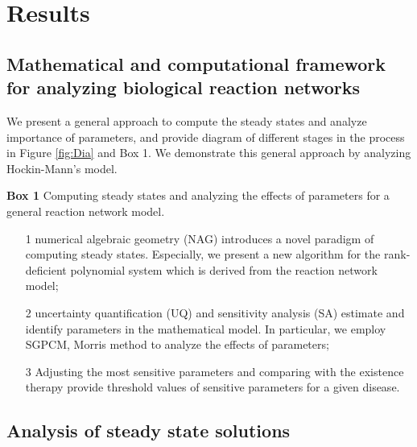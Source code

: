 \def\CTeXPreproc{Created by ctex v0.2.11, don't edit!}\section*{Results}
\label{sec:results}

\subsection*{Mathematical and computational framework for analyzing biological reaction networks}
We present a general approach to compute the steady states and
analyze importance of parameters, and provide diagram of different
stages in the process in Figure \ref{fig:Dia} and Box 1. 
We demonstrate this general approach by analyzing Hockin-Mann's model.


\begin{algorithm}[H]
\SetAlgoLined
{\bf Box 1} Computing
steady states and analyzing the effects of parameters for a general reaction network model.
\begin{itemize}
\item[1] numerical algebraic geometry
(NAG) introduces a novel paradigm of computing steady states.
Especially, we present a new algorithm for the rank-deficient
polynomial system which is derived from the reaction network model;
\item[2] uncertainty quantification (UQ) and sensitivity analysis (SA)
estimate and identify parameters in the mathematical model. In
particular, we employ SGPCM, Morris method to analyze the effects of
parameters;
\item[3] Adjusting the most sensitive parameters and comparing with the existence
therapy provide  threshold values of sensitive parameters for a given
disease.
\end{itemize}
\end{algorithm}
\subsection*{Analysis of steady state solutions}
\label{sec:res}

